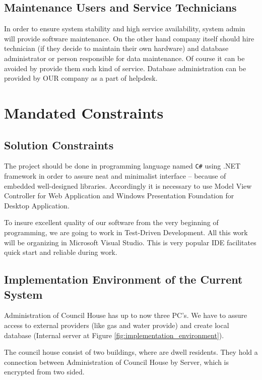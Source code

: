 \documentclass[a4paper,11pt,onecolumn,oneside]{book}
\begin{document}
\subsection{Maintenance Users and Service Technicians}

In order to ensure system stability and high service availability, system admin will provide software maintenance. On the other hand company itself should hire technician (if they decide to maintain their own hardware) and database administrator or person responsible for data maintenance. Of course it can be avoided by provide them such kind of service.
Database administration can be provided by OUR company as a part of helpdesk.



\section{Mandated Constraints}
\subsection{Solution Constraints}

The project should be done in programming language named \texttt{C\#} using .NET framework in order to assure neat and minimalist interface – because of embedded well-designed libraries. Accordingly it is necessary to use Model View Controller for Web Application and Windows Presentation Foundation for Desktop Application.

To insure excellent quality of our software from the very beginning of programming, we are going to work in Test-Driven Development. All this work will be organizing in Microsoft Visual Studio. This is very popular IDE facilitates quick start and reliable during work.

\subsection{Implementation Environment of the Current System}

Administration of Council House has up to now three PC’s. We have to assure access to external providers (like gas and water provide) and create local database (Internal server at Figure \ref{fig:implementation_environment}).

The council house consist of two buildings, where are dwell residents. They hold a connection between Administration of Council House by Server, which is encrypted from two sided.
\end{document}
